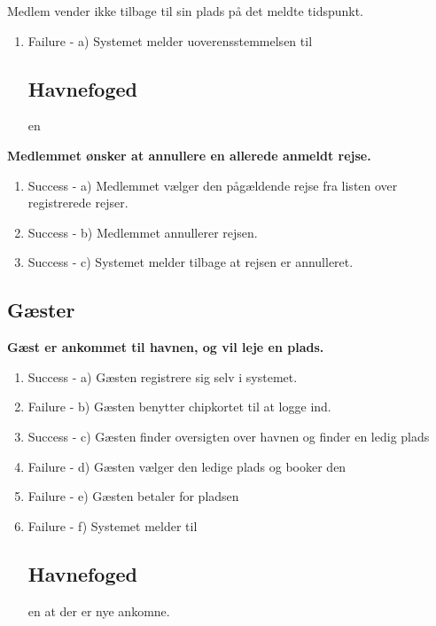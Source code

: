 	\item{\bf{Medlem vender ikke tilbage til sin plads på det meldte tidspunkt.
	  \begin{enumerate}
			\item Failure -  a) Systemet melder uoverensstemmelsen til \subsection{Havnefoged}en
	   \end{enumerate}

	\item{\bf{Medlemmet ønsker at annullere en allerede anmeldt rejse.}}
	  \begin{enumerate}
			\item Success -  a) Medlemmet vælger den pågældende rejse fra listen over registrerede rejser.
			\item Success -  b) Medlemmet annullerer rejsen.
			\item Success -  c) Systemet melder tilbage at rejsen er annulleret.
	   \end{enumerate}

\subsection{Gæster}
	\item{\bf{Gæst er ankommet til havnen, og vil leje en plads.}}
	  \begin{enumerate}
			\item Success -  a) Gæsten registrere sig selv i systemet.
			\item Failure -  b) Gæsten benytter chipkortet til at logge ind.
			\item Success -  c) Gæsten finder oversigten over havnen og finder en ledig plads
			\item Failure -  d) Gæsten vælger den ledige plads og booker den
			\item Failure -  e) Gæsten betaler for pladsen
			\item Failure -  f) Systemet melder til \subsection{Havnefoged}en at der er nye ankomne.
	   \end{enumerate}
	   
}}
